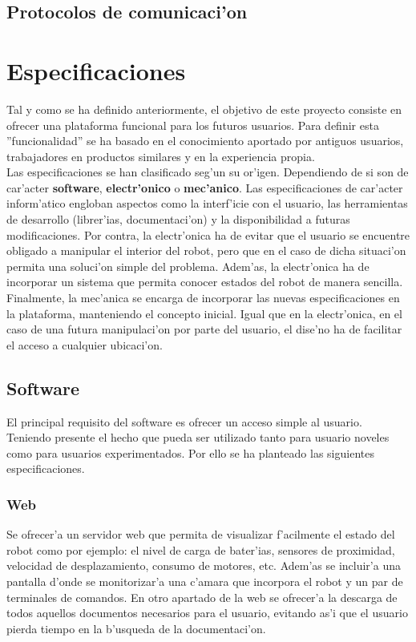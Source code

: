 \documentclass[twoside,12pt]{article}
\begin{document}
\subsection{Protocolos de comunicaci'on}


\section{Especificaciones}
Tal y como se ha definido anteriormente, el objetivo de este proyecto consiste en ofrecer una plataforma funcional para los futuros usuarios. Para definir esta ''funcionalidad'' se ha basado en el conocimiento aportado por antiguos usuarios, trabajadores en productos similares y en la experiencia propia. \\

Las especificaciones se han clasificado seg'un su or'igen. Dependiendo de si son de car'acter \textbf{software}, \textbf{electr'onico} o \textbf{mec'anico}. Las especificaciones de car'acter inform'atico engloban aspectos como la interf'icie con el usuario, las herramientas de desarrollo (librer'ias, documentaci'on) y la disponibilidad a futuras modificaciones. Por contra, la electr'onica ha de evitar que el usuario se encuentre obligado a manipular el interior del robot, pero que en el caso de dicha situaci'on permita una soluci'on simple del problema. Adem'as, la electr'onica ha de incorporar un sistema que permita conocer estados del robot de manera sencilla. Finalmente, la mec'anica se encarga de incorporar las nuevas especificaciones en la plataforma, manteniendo el concepto inicial. Igual que en la electr'onica, en el caso de una futura manipulaci'on por parte del usuario, el dise'no ha de facilitar el acceso a cualquier ubicaci'on.

\subsection{Software}
El principal requisito del software es ofrecer un acceso simple al usuario. Teniendo presente el hecho que pueda ser utilizado tanto para usuario noveles como para usuarios experimentados. Por ello se ha planteado las siguientes especificaciones.

\subsubsection{Web}
Se ofrecer'a un servidor web que permita de visualizar f'acilmente el estado del robot como por ejemplo: el nivel de carga de bater'ias, sensores de proximidad, velocidad de desplazamiento, consumo de motores, etc. Adem'as se incluir'a una pantalla d'onde se monitorizar'a una c'amara que incorpora el robot y un par de terminales de comandos.
En otro apartado de la web se ofrecer'a la descarga de todos aquellos documentos necesarios para el usuario, evitando as'i que el usuario pierda tiempo en la b'usqueda de la documentaci'on.
\end{document}
